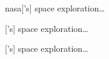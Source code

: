 \documentclass[20pt]{extarticle}
\begin{document}
\gls{nasa}['s] space exploration\ldots


['s] space exploration\ldots


['s] space exploration\ldots
\end{document}
